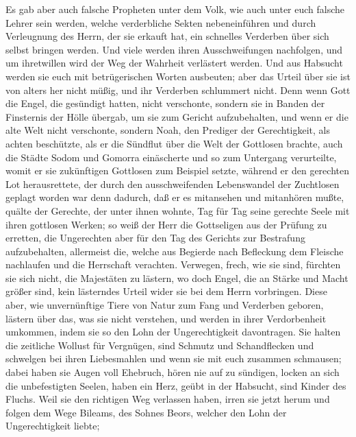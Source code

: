  Es gab aber auch falsche Propheten unter dem Volk, wie
auch unter euch falsche Lehrer sein werden, welche verderbliche Sekten
nebeneinführen und durch Verleugnung des Herrn, der sie erkauft hat, ein
schnelles Verderben über sich selbst bringen werden.  Und
viele werden ihren Ausschweifungen nachfolgen, und um ihretwillen wird
der Weg der Wahrheit verlästert werden.  Und aus Habsucht
werden sie euch mit betrügerischen Worten ausbeuten; aber das Urteil
über sie ist von alters her nicht müßig, und ihr Verderben schlummert
nicht.  Denn wenn Gott die Engel, die gesündigt hatten,
nicht verschonte, sondern sie in Banden der Finsternis der Hölle
übergab, um sie zum Gericht aufzubehalten,  und wenn er
die alte Welt nicht verschonte, sondern Noah, den Prediger der
Gerechtigkeit, als achten beschützte, als er die Sündflut über die Welt
der Gottlosen brachte,  auch die Städte Sodom und Gomorra
einäscherte und so zum Untergang verurteilte, womit er sie zukünftigen
Gottlosen zum Beispiel setzte,  während er den gerechten
Lot herausrettete, der durch den ausschweifenden Lebenswandel der
Zuchtlosen geplagt worden war  denn dadurch, daß er es
mitansehen und mitanhören mußte, quälte der Gerechte, der unter ihnen
wohnte, Tag für Tag seine gerechte Seele mit ihren gottlosen Werken;
 so weiß der Herr die Gottseligen aus der Prüfung zu
erretten, die Ungerechten aber für den Tag des Gerichts zur Bestrafung
aufzubehalten,  allermeist die, welche aus Begierde nach
Befleckung dem Fleische nachlaufen und die Herrschaft verachten.
Verwegen, frech, wie sie sind, fürchten sie sich nicht, die Majestäten
zu lästern,  wo doch Engel, die an Stärke und Macht
größer sind, kein lästerndes Urteil wider sie bei dem Herrn vorbringen.
 Diese aber, wie unvernünftige Tiere von Natur zum Fang
und Verderben geboren, lästern über das, was sie nicht verstehen, und
werden in ihrer Verdorbenheit umkommen,  indem sie so den
Lohn der Ungerechtigkeit davontragen. Sie halten die zeitliche Wollust
für Vergnügen, sind Schmutz und Schandflecken und schwelgen bei ihren
Liebesmahlen und wenn sie mit euch zusammen schmausen; 
dabei haben sie Augen voll Ehebruch, hören nie auf zu sündigen, locken
an sich die unbefestigten Seelen, haben ein Herz, geübt in der Habsucht,
sind Kinder des Fluchs.  Weil sie den richtigen Weg
verlassen haben, irren sie jetzt herum und folgen dem Wege Bileams, des
Sohnes Beors, welcher den Lohn der Ungerechtigkeit liebte;
